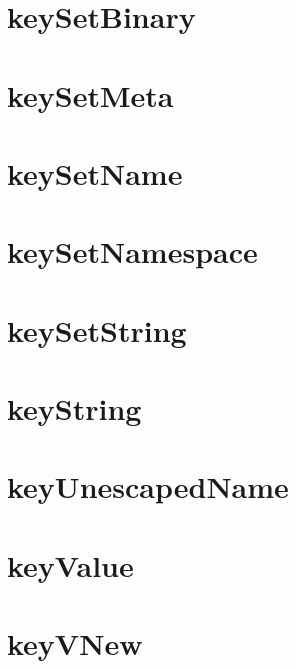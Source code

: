\documentclass[twoside]{book}
\newcommand{\+}{\discretionary{\mbox{\scriptsize$\hookleftarrow$}}{}{}}
\begin{document}
\chapter{key\+Set\+Binary}
\label{doc_api_review_core_keySetBinary_md}

\chapter{key\+Set\+Meta}
\label{doc_api_review_core_keySetMeta_md}

\chapter{key\+Set\+Name}
\label{doc_api_review_core_keySetName_md}

\chapter{key\+Set\+Namespace}
\label{doc_api_review_core_keySetNamespace_md}

\chapter{key\+Set\+String}
\label{doc_api_review_core_keySetString_md}

\chapter{key\+String}
\label{doc_api_review_core_keyString_md}

\chapter{key\+Unescaped\+Name}
\label{doc_api_review_core_keyUnescapedName_md}

\chapter{key\+Value}
\label{doc_api_review_core_keyValue_md}

\chapter{key\+V\+New}
\label{doc_api_review_core_keyVNew_md}

\end{document}
